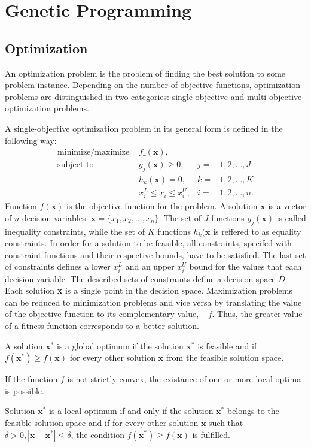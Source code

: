 \chapter{Genetic Programming}
\label{genprog}
\section{Optimization}
An optimization problem is the problem of finding the best solution to some problem instance. %
Depending on the number of objective functions, optimization problems are distinguished in two categories: single-objective and multi-objective optimization problems.

A single-objective optimization problem in its general form is defined in the following way:
\begin{align*}
\label{opt_problem}
\text{minimize/maximize } & f\_(\textbf{x}),   \\
\text{subject to } & g_j(\textbf{x}) \geq 0, & j = & 1, 2, ..., J \\
           & h_k(\textbf{x}) = 0, & k = & 1, 2, ..., K \\
           & x_{i}^{L} \leq x_i \leq x_{i}^{U}, & i = & 1, 2, ..., n. 
\end{align*}
Function $f(\textbf{x})$ is the objective function for the problem.
A solution $\textbf{x}$ is a vector of $n$ decision variables: $\textbf{x} = \{x_1,x_2,...,x_n\}$.
The set of $J$ functions $g_j(\textbf{x})$ is called inequality constraints, while the set of $K$ functions $h_k(\textbf{x}$ is reffered to as equality constraints.
In order for a solution to be feasible, all constraints, specifed with constraint functions and their respective bounds, have to be satisfied.
The last set of constraints defines a lower $x_{i}^{L}$ and an upper $x_{i}^{U}$ bound for the values that each decision variable. 
The described sets of constraints define a decision space $D$.
Each solution \textbf{x} is a single point in the decision space.
Maximization problems can be reduced to minimization problems and vice versa by translating the value of the objective function to its complementary value, $-f$.
Thus, the greater value of a fitness function corresponds to a better solution.

\begin{mydef}
A solution $\textbf{x}^{*}$ is a global optimum if the solution $\textbf{x}^{*}$ is feasible and if $f(\textbf{x}^{*}) \geq f(\textbf{x})$ for every other solution $\textbf{x}$ from the feasible solution space.
\end{mydef}
If the function $f$ is not strictly convex, the existance of one or more local optima is possible.
\begin{mydef}
Solution $\textbf{x}^{*}$ is a local optimum if and only if the solution $\textbf{x}^{*}$ belongs to the feasible solution space and if for every other solution $\textbf{x}$ such that 
$\delta > 0, |\textbf{x} - \textbf{x}^{*}| \leq \delta$, the condition $f(\textbf{x}^{*}) \geq f(\textbf{x})$ is fulfilled.
\end{mydef}

